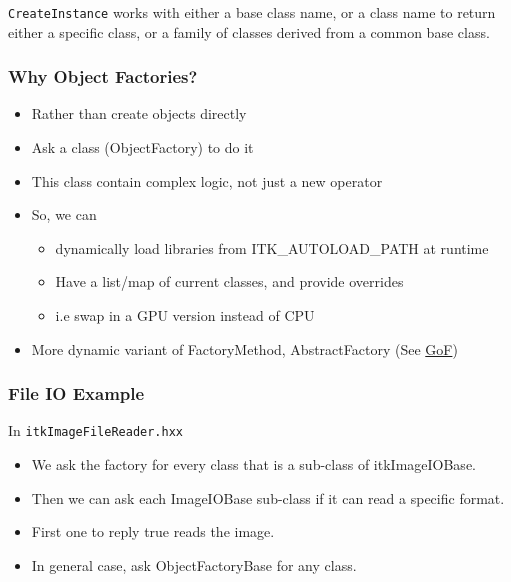 \texttt{CreateInstance} works with either a base class name, or a class
name to return either a specific class, or a family of classes derived
from a common base class.

\subsubsection{Why Object Factories?}\label{why-object-factories}

\begin{itemize}
\itemsep1pt\parskip0pt
\item
  Rather than create objects directly
\item
  Ask a class (ObjectFactory) to do it
\item
  This class contain complex logic, not just a new operator
\item
  So, we can

  \begin{itemize}
  \itemsep1pt\parskip0pt
  \item
    dynamically load libraries from ITK\_AUTOLOAD\_PATH at runtime
  \item
    Have a list/map of current classes, and provide overrides
  \item
    i.e swap in a GPU version instead of CPU
  \end{itemize}
\item
  More dynamic variant of FactoryMethod, AbstractFactory (See
  \href{http://en.wikipedia.org/wiki/Design_Patterns}{GoF})
\end{itemize}

\subsubsection{File IO Example}\label{file-io-example}

In \texttt{itkImageFileReader.hxx}

\begin{Shaded}
\begin{Highlighting}[]
        \NormalTok{);}
\end{Highlighting}
\end{Shaded}

\begin{itemize}
\itemsep1pt\parskip0pt
\item
  We ask the factory for every class that is a sub-class of
  itkImageIOBase.
\item
  Then we can ask each ImageIOBase sub-class if it can read a specific
  format.
\item
  First one to reply true reads the image.
\item
  In general case, ask ObjectFactoryBase for any class.
\end{itemize}

